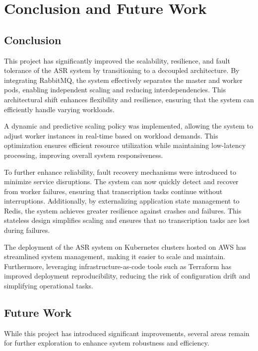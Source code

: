 \chapter{Conclusion and Future Work} \label{chapter:conclusion_and_future_work}

\section{Conclusion}

This project has significantly improved the scalability, resilience, and fault tolerance of the ASR system by transitioning to a decoupled architecture. By integrating RabbitMQ, the system effectively separates the master and worker pods, enabling independent scaling and reducing interdependencies. This architectural shift enhances flexibility and resilience, ensuring that the system can efficiently handle varying workloads.  

A dynamic and predictive scaling policy was implemented, allowing the system to adjust worker instances in real-time based on workload demands. This optimization ensures efficient resource utilization while maintaining low-latency processing, improving overall system responsiveness.  

To further enhance reliability, fault recovery mechanisms were introduced to minimize service disruptions. The system can now quickly detect and recover from worker failures, ensuring that transcription tasks continue without interruptions. Additionally, by externalizing application state management to Redis, the system achieves greater resilience against crashes and failures. This stateless design simplifies scaling and ensures that no transcription tasks are lost during failures.  

The deployment of the ASR system on Kubernetes clusters hosted on AWS has streamlined system management, making it easier to scale and maintain. Furthermore, leveraging infrastructure-as-code tools such as Terraform has improved deployment reproducibility, reducing the risk of configuration drift and simplifying operational tasks.  

\section{Future Work}

While this project has introduced significant improvements, several areas remain for further exploration to enhance system robustness and efficiency.


